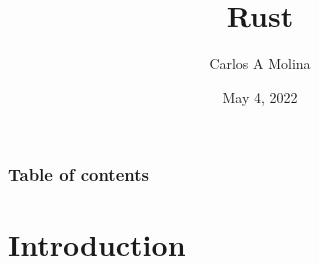 \documentclass{beamer}
\title[Rust]{Rust} %
\author{Carlos A Molina}
\date{May 4, 2022}
\begin{document}
\begin{frame}
\titlepage %
\end{frame}

\begin{frame}
\frametitle{Table of contents}
\tableofcontents %
\end{frame}


\section{Introduction} %
\end{document}

